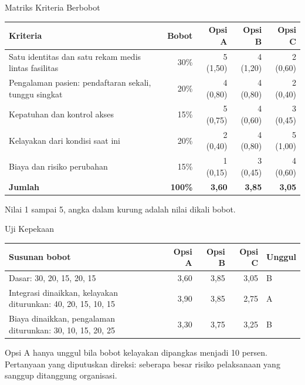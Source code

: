 \documentclass[aspectratio=169, table, 12pt]{beamer}
\begin{document}
\begin{frame}{{\Large Matriks Kriteria Berbobot}}
  \footnotesize
  \begin{tabularx}{\textwidth}{>{\raggedright\arraybackslash}Xrrrr}
    \hline
    \textbf{Kriteria} & \textbf{Bobot} & \textbf{Opsi A} & \textbf{Opsi B} & \textbf{Opsi C} \\
    \hline
    Satu identitas dan satu rekam medis lintas fasilitas & 30\% & 5 (1,50) & 4 (1,20) &
      2 (0,60) \\
    \hline
    Pengalaman pasien: pendaftaran sekali, tunggu singkat & 20\% & 4 (0,80) & 4 (0,80) &
      2 (0,40) \\
    \hline
    Kepatuhan dan kontrol akses & 15\% & 5 (0,75) & 4 (0,60) & 3 (0,45) \\
    \hline
    Kelayakan dari kondisi saat ini & 20\% & 2 (0,40) & 4 (0,80) & 5 (1,00) \\
    \hline
    Biaya dan risiko perubahan & 15\% & 1 (0,15) & 3 (0,45) & 4 (0,60) \\
    \hline
    \textbf{Jumlah} & \textbf{100\%} & \textbf{3,60} & \textbf{3,85} & \textbf{3,05} \\
    \hline
  \end{tabularx}

  \vspace{6pt}
  \small Nilai 1 sampai 5, angka dalam kurung adalah nilai dikali bobot.
\end{frame}

\begin{frame}{{\Large Uji Kepekaan}}
  \footnotesize
  \begin{tabularx}{\textwidth}{>{\raggedright\arraybackslash}Xrrrl}
    \hline
    \textbf{Susunan bobot} & \textbf{Opsi A} & \textbf{Opsi B} & \textbf{Opsi C} &
      \textbf{Unggul} \\
    \hline
    Dasar: 30, 20, 15, 20, 15 & 3,60 & 3,85 & 3,05 & B \\
    \hline
    Integrasi dinaikkan, kelayakan diturunkan: 40, 20, 15, 10, 15 & 3,90 & 3,85 & 2,75 & A \\
    \hline
    Biaya dinaikkan, pengalaman diturunkan: 30, 10, 15, 20, 25 & 3,30 & 3,75 & 3,25 & B \\
    \hline
  \end{tabularx}

  \vspace{8pt}
  \small Opsi A hanya unggul bila bobot kelayakan dipangkas menjadi 10 persen. Pertanyaan yang diputuskan
  direksi: seberapa besar risiko pelaksanaan yang sanggup ditanggung organisasi.
\end{frame}
\end{document}
